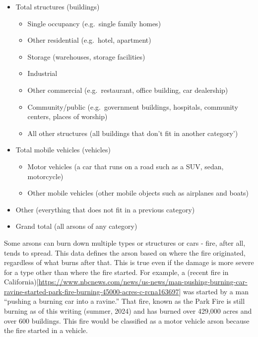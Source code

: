 \documentclass[
]{krantz}
\providecommand{\tightlist}{%
  \setlength{\itemsep}{0pt}\setlength{\parskip}{0pt}}
\begin{document}
\begin{itemize}
\tightlist
\item
  Total structures (buildings)

  \begin{itemize}
  \tightlist
  \item
    Single occupancy (e.g.~single family homes)
  \item
    Other residential (e.g.~hotel, apartment)
  \item
    Storage (warehouses, storage facilities)
  \item
    Industrial
  \item
    Other commercial (e.g.~restaurant, office building, car
    dealership)
  \item
    Community/public (e.g.~government buildings, hospitals,
    community centers, places of worship)
  \item
    All other structures (all buildings that don't fit in
    another category')
  \end{itemize}
\item
  Total mobile vehicles (vehicles)

  \begin{itemize}
  \tightlist
  \item
    Motor vehicles (a car that runs on a road such as a SUV,
    sedan, motorcycle)
  \item
    Other mobile vehicles (other mobile objects such as
    airplanes and boats)
  \end{itemize}
\item
  Other (everything that does not fit in a previous
  category)
\item
  Grand total (all arsons of any category)
\end{itemize}

Some arsons can burn down multiple types or structures or
cars - fire, after all, tends to spread. This data defines
the arson based on where the fire originated, regardless of
what burns after that. This is true even if the damage is
more severe for a type other than where the fire started.
For example, a (recent fire in
California){[}\url{https://www.nbcnews.com/news/us-news/man-pushing-burning-car-ravine-started-park-fire-burning-45000-acres-c-rcna163697}{]}
was started by a man ``pushing a burning car into a
ravine.'' That fire, known as the Park Fire is still burning
as of this writing (summer, 2024) and has burned over
429,000 acres and over 600 buildings. This fire would be
classified as a motor vehicle arson because the fire started
in a vehicle.
\end{document}
